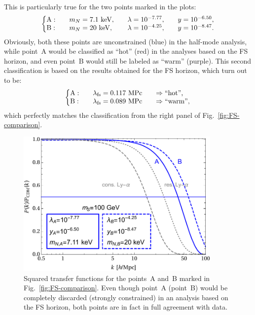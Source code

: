 This is particularly true for the two points marked in the plots:
\begin{equation}
 \left\{
 \begin{matrix}
 {\rm A:}\hfill & & m_N = 7.1~{\rm keV},\hfill\hfill\hfill & & \lambda = 10^{-7.77},\hfill\hfill\hfill & & y = 10^{-6.50},\hfill\hfill\hfill\hfill\\
 {\rm B:}\hfill & & m_N = 20~{\rm keV},\hfill\hfill\hfill & & \lambda = 10^{-4.25},\hfill\hfill\hfill & & y = 10^{-8.47}.\hfill\hfill\hfill\hfill
 \end{matrix}
 \right.
 \label{eq:FS-points}
\end{equation}
Obviously, both these points are unconstrained (blue) in the half-mode analysis, while point~A would be classified as ``hot'' (red) in the analyses based on the FS horizon, and even point~B would still be labeled as ``warm'' (purple). This second classification is based on the results obtained for the FS horizon, which turn out to be:
\begin{equation}
 \left\{
 \begin{matrix}
 {\rm A:}\hfill\hfill\hfill & & \lambda_{\rm fs} = 0.117~{\rm MPc} \hfill\hfill\hfill & & \Rightarrow \text{``hot'',}\hfill\hfill\hfill\\
 {\rm B:}\hfill\hfill\hfill & & \lambda_{\rm fs} = 0.089~{\rm MPc} \hfill\hfill\hfill & & \Rightarrow\text{``warm'',}\hfill\hfill\hfill
 \end{matrix}
 \right.
 \label{eq:FS-classification}
\end{equation}
which perfectly matches the classification from the right panel of Fig.~\ref{fig:FS-comparison}.

\begin{figure}[ht]
 \centering
 \includegraphics[width=10cm]{figures/Tsquared_mS_100_2SampleCases.pdf}
 \caption{\label{fig:HM-resolution}Squared transfer functions for the points~A and~B marked in Fig.~\ref{fig:FS-comparison}. Even though point~A (point~B) would be completely discarded (strongly constrained) in an analysis based on the FS horizon, both points are in fact in full agreement with data.}
\end{figure}

